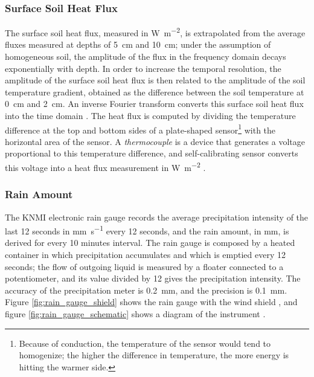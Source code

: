 \documentclass[a4paper,11pt]{kth-mag}
\begin{document}

\subsubsection{Surface Soil Heat Flux}
The surface soil heat flux, measured in \si{\watt\per\square\meter}, is extrapolated from the average fluxes measured at depths of \SI{5}{\centi\meter} and \SI{10}{\centi\meter}; under the assumption of homogeneous soil, the amplitude of the flux in the frequency domain decays exponentially with depth. In order to increase the temporal resolution, the amplitude of the surface soil heat flux is then related to the amplitude of the soil temperature gradient, obtained as the difference between the soil temperature at \SI{0}{\centi\meter} and \SI{2}{\centi\meter}. An inverse Fourier transform converts this surface soil heat flux into the time domain \citep[Appendix~A]{surface_soilheat}. The heat flux is computed by dividing the temperature difference at the top and bottom sides of a plate-shaped sensor\footnote{Because of conduction, the temperature of the sensor would tend to homogenize; the higher the difference in temperature, the more energy is hitting the warmer side.} with the horizontal area of the sensor. A \emph{thermocouple} is a device that generates a voltage proportional to this temperature difference, and self-calibrating sensor converts this voltage into a heat flux measurement in \si{\watt\per\square\meter}  \citep{soilheat_sensor}.


\subsubsection{Rain Amount}
The KNMI electronic rain gauge \citep{rain,windsheld_rain} records the average precipitation intensity of the last 12 seconds in \si{\milli\meter\per\second} every 12 seconds, and the rain amount, in \si{\milli\meter}, is derived for every 10 minutes interval. The rain gauge is composed by a heated container in which precipitation accumulates and which is emptied every 12 seconds; the flow of outgoing liquid is measured by a floater connected to a potentiometer, and its value divided by 12 gives the precipitation intensity. The accuracy of the precipitation meter is \SI{0.2}{\milli\meter}, and the precision is \SI{0.1}{\milli\meter}. Figure \ref{fig:rain_gauge_shield} shows the rain gauge with the wind shield \citep{windsheld_rain}, and figure \ref{fig:rain_gauge_schematic} shows a diagram of the instrument \citep{rain}.
\end{document}

